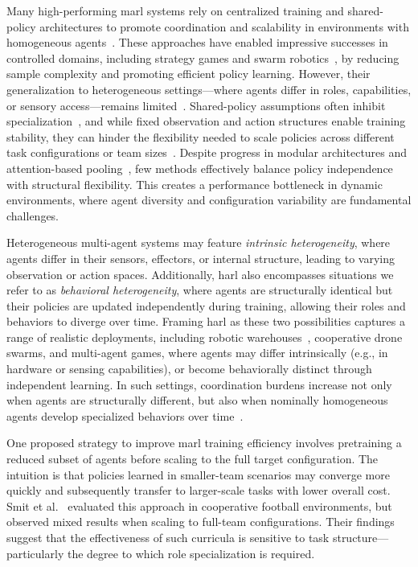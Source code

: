 Many high-performing \gls{marl} systems rely on 
centralized training and shared-policy architectures to promote coordination and scalability 
in environments with homogeneous agents~\cite{ackermann2019,zhou2023}.
These approaches have enabled impressive successes in controlled domains, 
including strategy games and swarm robotics~\cite{vinyals2019, hoang2023}, 
by reducing sample complexity and promoting efficient policy learning. However, their 
generalization to heterogeneous settings—where agents differ in roles, capabilities, or 
sensory access—remains limited~\cite{zhong2024}. 
Shared-policy assumptions often inhibit specialization~\cite{smit2023}, 
and while fixed observation and action structures enable training stability, 
they can hinder the flexibility needed to scale policies across different 
task configurations or team sizes~\cite{papoudakis2021}. Despite progress 
in modular architectures and attention-based pooling~\cite{iqbal2021, foerster2018}, 
few methods effectively balance policy independence with structural flexibility. 
This creates a performance bottleneck in dynamic environments, where agent diversity and 
configuration variability are fundamental challenges.

Heterogeneous multi-agent systems may feature \emph{intrinsic heterogeneity}, 
where agents differ in their sensors, effectors, or internal structure, 
leading to varying observation or action spaces. Additionally, 
\gls{harl} also encompasses situations we refer to as \emph{behavioral heterogeneity}, 
where agents are structurally identical but their policies are updated independently 
during training, allowing their roles and behaviors to diverge over time. 
Framing \gls{harl} as these two possibilities captures a range of realistic deployments, including 
robotic warehouses~\cite{rizk2019}, cooperative drone swarms, and multi-agent games, where 
agents may differ intrinsically (e.g., in hardware or sensing capabilities), 
or become behaviorally distinct through independent learning. In such settings, 
coordination burdens increase not only when agents are structurally different, 
but also when nominally homogeneous agents develop specialized behaviors over 
time~\cite{shoham2007,ackermann2019}.

One proposed strategy to improve \gls{marl} training efficiency involves pretraining 
a reduced subset of agents before scaling to the full target configuration. 
The intuition is that policies learned in smaller-team scenarios may converge 
more quickly and subsequently transfer to larger-scale tasks with lower overall cost. 
Smit et al.~\cite{smit2023} evaluated this approach in cooperative football environments, 
but observed mixed results when scaling to full-team configurations. Their findings 
suggest that the effectiveness of such curricula is sensitive to task structure—particularly 
the degree to which role specialization is required.

